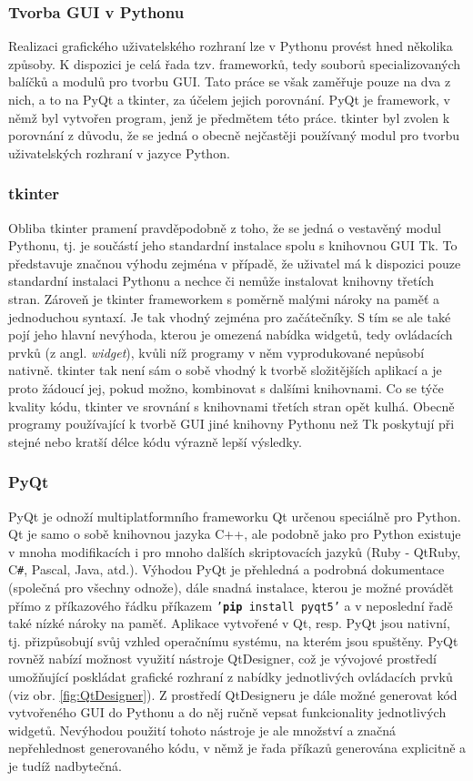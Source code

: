 \documentclass[a4paper, 12pt]{article}
\begin{document}
\subsubsection{Tvorba GUI v Pythonu}
 Realizaci grafického uživatelského rozhraní lze v Pythonu provést hned několika způsoby. K dispozici je celá řada tzv. frameworků, tedy souborů specializovaných balíčků a modulů pro tvorbu GUI. Tato práce se však zaměřuje pouze na dva z nich, a to na PyQt a tkinter, za účelem jejich porovnání. PyQt je framework, v němž byl vytvořen program, jenž je předmětem této práce. tkinter byl zvolen k porovnání z důvodu, že se jedná o obecně nejčastěji používaný modul pro tvorbu uživatelských rozhraní v jazyce Python.
\subsubsection*{tkinter}
Obliba tkinter pramení pravděpodobně z toho, že se jedná o vestavěný modul Pythonu, tj. je součástí jeho standardní instalace spolu s knihovnou GUI Tk. To představuje značnou výhodu zejména v případě, že uživatel má k dispozici pouze standardní instalaci Pythonu a nechce či nemůže instalovat knihovny třetích stran. \cite{Python3Summerfield:2} Zároveň je tkinter frameworkem s poměrně malými nároky na paměť a jednoduchou syntaxí. Je tak vhodný zejména pro začátečníky. S tím se ale také pojí jeho hlavní nevýhoda, kterou je omezená nabídka widgetů, tedy ovládacích prvků (z angl. \textit{widget}), kvůli níž programy v něm vyprodukované nepůsobí nativně. tkinter tak není sám o sobě vhodný k tvorbě složitějších aplikací a je proto žádoucí jej, pokud možno, kombinovat s dalšími knihovnami. Co se týče kvality kódu, tkinter ve srovnání s knihovnami třetích stran opět kulhá. Obecně programy používající k tvorbě GUI jiné knihovny Pythonu než Tk poskytují při stejné nebo kratší délce kódu výrazně lepší výsledky. \cite{Python3Summerfield:2}  

\subsubsection*{PyQt}
PyQt je odnoží multiplatformního frameworku Qt určenou speciálně pro Python. Qt je samo o sobě knihovnou jazyka C++, ale podobně jako pro Python existuje v mnoha modifikacích i pro mnoho dalších skriptovacích jazyků (Ruby - QtRuby, C\texttt{\#}, Pascal, Java, atd.). Výhodou PyQt je přehledná a podrobná dokumentace (společná pro všechny odnože), dále snadná instalace, kterou je možné provádět přímo z příkazového řádku příkazem \texttt{'\textbf{pip} install pyqt5'} a v neposlední řadě také nízké nároky na paměť. Aplikace vytvořené v Qt, resp. PyQt jsou nativní, tj. přizpůsobují svůj vzhled operačnímu systému, na kterém jsou spuštěny. PyQt rovněž nabízí možnost využití nástroje QtDesigner, což je vývojové prostředí umožňující poskládat grafické rozhraní z nabídky jednotlivých ovládacích prvků (viz obr. \ref{fig:QtDesigner}). Z prostředí QtDesigneru je dále možné generovat kód vytvořeného GUI do Pythonu a do něj ručně vepsat funkcionality jednotlivých widgetů. Nevýhodou použití tohoto nástroje je ale množství a značná nepřehlednost generovaného kódu, v němž je řada příkazů generována explicitně a je tudíž nadbytečná. 
\end{document}
